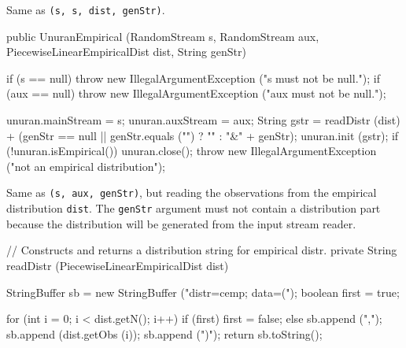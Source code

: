 \begin{tabb}  
  Same as \texttt{(s, s, dist, genStr)}.
\end{tabb}
\begin{code}

   public UnuranEmpirical (RandomStream s, RandomStream aux,
                           PiecewiseLinearEmpiricalDist dist, String genStr)\begin{hide} {
      if (s == null)
         throw new IllegalArgumentException ("s must not be null.");
      if (aux == null)
         throw new IllegalArgumentException ("aux must not be null.");

      unuran.mainStream = s;
      unuran.auxStream = aux;
      String gstr = readDistr (dist) + 
        (genStr == null || genStr.equals ("") ? "" : "&" + genStr);
      unuran.init (gstr);
      if (!unuran.isEmpirical()) {
         unuran.close();
         throw new IllegalArgumentException ("not an empirical distribution");
      }
   }\end{hide}
\end{code}
\begin{tabb} 
  Same as \texttt{(s, aux, genStr)}, but reading 
  the observations from the empirical distribution \texttt{dist}. 
  The \texttt{genStr} argument must not contain a distribution part
  because the distribution will be generated from the input stream reader.
\end{tabb}
\begin{code}\begin{hide}
   // Constructs and returns a distribution string for empirical distr.
   private String readDistr (PiecewiseLinearEmpiricalDist dist) {
      StringBuffer sb = new StringBuffer ("distr=cemp; data=(");
      boolean first = true;

      for (int i = 0; i < dist.getN(); i++) {
         if (first)
            first = false;
         else
            sb.append (",");
         sb.append (dist.getObs (i));
      }
      sb.append (")");
      return sb.toString();
   }

\end{hide}\end{code}

